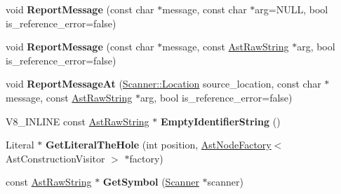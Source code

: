 \begin{DoxyCompactItemize}
\item 
\hypertarget{classv8_1_1internal_1_1_parser_traits_a2ac2088277c6fc62134288ddc1a0b68e}{}void {\bfseries Report\+Message} (const char $\ast$message, const char $\ast$arg=N\+U\+L\+L, bool is\+\_\+reference\+\_\+error=false)\label{classv8_1_1internal_1_1_parser_traits_a2ac2088277c6fc62134288ddc1a0b68e}

\item 
\hypertarget{classv8_1_1internal_1_1_parser_traits_a3b2eede821d8335047a84f11aca7404a}{}void {\bfseries Report\+Message} (const char $\ast$message, const \hyperlink{classv8_1_1internal_1_1_ast_raw_string}{Ast\+Raw\+String} $\ast$arg, bool is\+\_\+reference\+\_\+error=false)\label{classv8_1_1internal_1_1_parser_traits_a3b2eede821d8335047a84f11aca7404a}

\item 
\hypertarget{classv8_1_1internal_1_1_parser_traits_a976b93789505c0bcf9fcbe1589673ef6}{}void {\bfseries Report\+Message\+At} (\hyperlink{structv8_1_1internal_1_1_scanner_1_1_location}{Scanner\+::\+Location} source\+\_\+location, const char $\ast$message, const \hyperlink{classv8_1_1internal_1_1_ast_raw_string}{Ast\+Raw\+String} $\ast$arg, bool is\+\_\+reference\+\_\+error=false)\label{classv8_1_1internal_1_1_parser_traits_a976b93789505c0bcf9fcbe1589673ef6}

\item 
\hypertarget{classv8_1_1internal_1_1_parser_traits_ae1b7fd1a5cc960789abd70756a8ef71b}{}V8\+\_\+\+I\+N\+L\+I\+N\+E const \hyperlink{classv8_1_1internal_1_1_ast_raw_string}{Ast\+Raw\+String} $\ast$ {\bfseries Empty\+Identifier\+String} ()\label{classv8_1_1internal_1_1_parser_traits_ae1b7fd1a5cc960789abd70756a8ef71b}

\item 
\hypertarget{classv8_1_1internal_1_1_parser_traits_ae636ea2485459371290eba9177a5fac1}{}Literal $\ast$ {\bfseries Get\+Literal\+The\+Hole} (int position, \hyperlink{classv8_1_1internal_1_1_ast_node_factory}{Ast\+Node\+Factory}$<$ Ast\+Construction\+Visitor $>$ $\ast$factory)\label{classv8_1_1internal_1_1_parser_traits_ae636ea2485459371290eba9177a5fac1}

\item 
\hypertarget{classv8_1_1internal_1_1_parser_traits_a1d7b04ddff6eacc8ab04512ea3fe31b5}{}const \hyperlink{classv8_1_1internal_1_1_ast_raw_string}{Ast\+Raw\+String} $\ast$ {\bfseries Get\+Symbol} (\hyperlink{classv8_1_1internal_1_1_scanner}{Scanner} $\ast$scanner)\label{classv8_1_1internal_1_1_parser_traits_a1d7b04ddff6eacc8ab04512ea3fe31b5}


\end{DoxyCompactItemize}
